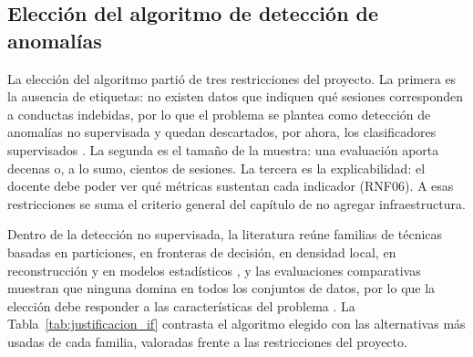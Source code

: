\subsection{Elección del algoritmo de detección de anomalías}
\label{sec:justificacion_if}

La elección del algoritmo partió de tres restricciones del proyecto. La primera es la ausencia de etiquetas: no existen datos que indiquen qué sesiones corresponden a conductas indebidas, por lo que el problema se plantea como detección de anomalías no supervisada y quedan descartados, por ahora, los clasificadores supervisados \parencite{Chandola2009}. La segunda es el tamaño de la muestra: una evaluación aporta decenas o, a lo sumo, cientos de sesiones. La tercera es la explicabilidad: el docente debe poder ver qué métricas sustentan cada indicador (RNF06). A esas restricciones se suma el criterio general del capítulo de no agregar infraestructura.

Dentro de la detección no supervisada, la literatura reúne familias de técnicas basadas en particiones, en fronteras de decisión, en densidad local, en reconstrucción y en modelos estadísticos \parencite{Chandola2009}, y las evaluaciones comparativas muestran que ninguna domina en todos los conjuntos de datos, por lo que la elección debe responder a las características del problema \parencite{Goldstein2016, Campos2016}. La Tabla~\ref{tab:justificacion_if} contrasta el algoritmo elegido con las alternativas más usadas de cada familia, valoradas frente a las restricciones del proyecto.

